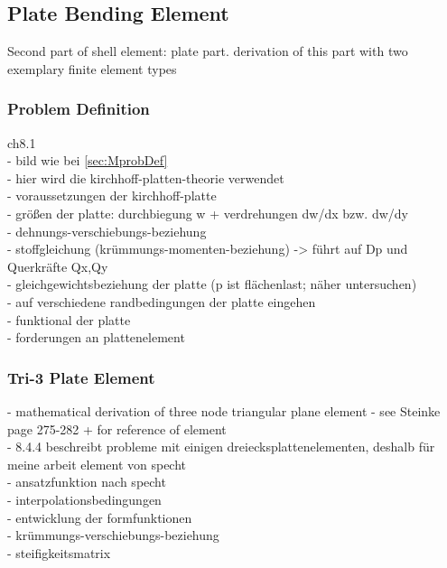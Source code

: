 \documentclass[11pt,twoside]{scrartcl}
\begin{document}
 \subsection{Plate Bending Element}
 Second part of shell element: plate part. derivation of this part with two exemplary finite element types
  \subsubsection{Problem Definition}
  \cite{steinke2005finite} ch8.1\\
  - bild wie bei \ref{sec:MprobDef}\\
  - hier wird die kirchhoff-platten-theorie verwendet\\
  - voraussetzungen der kirchhoff-platte\\
  - größen der platte: durchbiegung w + verdrehungen dw/dx bzw. dw/dy\\
  - dehnungs-verschiebungs-beziehung\\
  - stoffgleichung (krümmungs-momenten-beziehung) -> führt auf Dp und Querkräfte Qx,Qy\\
  - gleichgewichtsbeziehung der platte (p ist flächenlast; näher untersuchen)\\
  - auf verschiedene randbedingungen der platte eingehen\\
  - funktional der platte\\
  - forderungen an plattenelement
  \subsubsection{Tri-3 Plate Element} \cite{steinke2005finite}\cite{specht1988modified}
  - mathematical derivation of three node triangular plane element\newline
  - see Steinke \cite{steinke2005finite} page 275-282 + \cite{specht1988modified} for reference of element\\
  - 8.4.4 beschreibt probleme mit einigen dreiecksplattenelementen, deshalb für meine arbeit element von specht \cite{specht1988modified}\\
  - ansatzfunktion nach specht\\
  - interpolationsbedingungen\\
  - entwicklung der formfunktionen\\
  - krümmungs-verschiebungs-beziehung\\
  - steifigkeitsmatrix
\end{document}
